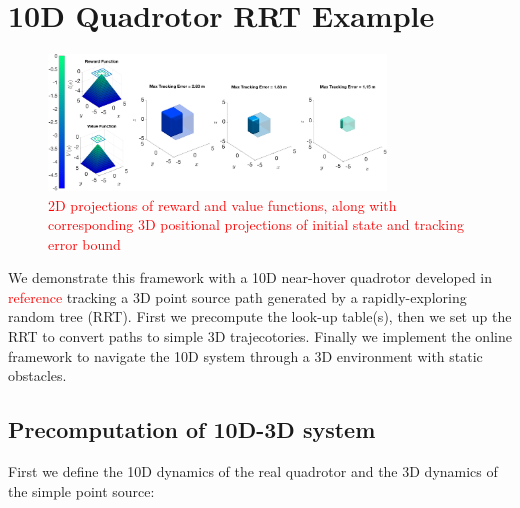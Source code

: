 \section{10D Quadrotor RRT Example \label{sec:results}}
\begin{figure}
	\centering
	\includegraphics[width=0.8\textwidth]{fig/quad10D_example_vel_[1_-1_1]}
	\caption{\textcolor{red}{2D projections of reward and value functions, along with corresponding 3D positional projections of initial state and tracking error bound}}
	\label{fig:quad10D_example}
\end{figure} 
We demonstrate this framework with a 10D near-hover quadrotor developed in \textcolor{red}{reference} tracking a 3D point source path generated by a rapidly-exploring random tree (RRT). First we precompute the look-up table(s), then we set up the RRT to convert paths to simple 3D trajecotories. Finally we implement the online framework to navigate the 10D system through a 3D environment with static obstacles.

\subsection{Precomputation of 10D-3D system}
First we define the 10D dynamics of the real quadrotor and the 3D dynamics of the simple point source:

